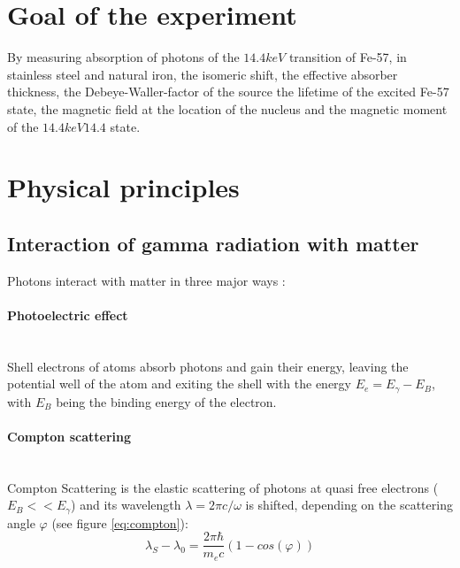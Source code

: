 \section{Goal of the experiment}
By measuring absorption of photons of the $\unit{14.4}{keV}$ transition of Fe-57, in stainless steel and natural iron, the isomeric shift, the effective absorber thickness, the  Debeye-Waller-factor of the source the lifetime of the excited Fe-57 state, the magnetic field at the location of the nucleus and the magnetic moment of the $\unit{14.4}{keV}14.4$ state.

\section{Physical principles}
\subsection{Interaction of gamma radiation with matter}
Photons interact with matter in three major ways \cite{Demtröder}:
\paragraph{Photoelectric effect} \ \\
Shell electrons of atoms absorb photons and gain their energy, leaving the potential well of the atom and exiting the shell with the energy $E_e = E_\gamma-E_B$, with $E_B$ being the binding energy of the electron.
\paragraph{Compton scattering} \ \\
Compton Scattering is the elastic scattering of photons at quasi free  electrons ($E_B << E_\gamma$) and its wavelength $\lambda=2\pi c/\omega$ is shifted, depending on the scattering angle $\varphi$ (see figure \ref*{eq:compton}):
\begin{equation}
\lambda_S -\lambda_0 = \frac{2 \pi \hbar}{m_e c}(1-cos(\varphi))
\label{eq:compton}
\end{equation}
